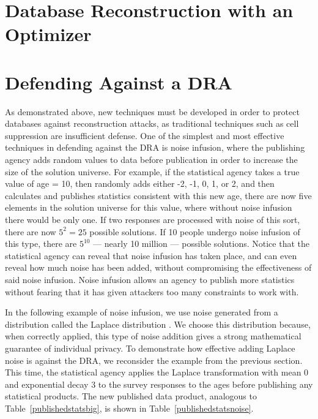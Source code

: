 \documentclass[5p,times,11pt]{elsarticle}
\begin{document}
\section{Database Reconstruction with an Optimizer}

\section{Defending Against a DRA}
As demonstrated above, new techniques must be developed in
order to protect databases against reconstruction attacks, as traditional techniques such as cell suppression are insufficient defense. One of the simplest and most effective techniques in defending against the DRA is noise infusion, where the publishing agency adds random values to data before publication in order to increase the size of the solution universe. For example, if the statistical agency takes a true value of age = 10, then randomly adds either -2, -1, 0, 1, or 2, and then calculates and publishes statistics consistent with this new age, there are now five elements in the solution universe for this value, where without noise infusion there would be only one. If two responses are processed with noise of this sort, there are now $5^2 = 25$ possible solutions. If 10 people undergo noise infusion of this type, there are $5^{10}$ --- nearly 10 million --- possible solutions. Notice that the statistical agency can reveal that noise infusion has taken place, and can even reveal how much noise has been added, without compromising the effectiveness of said noise infusion. Noise infusion allows an agency to publish more statistics without fearing that it has given attackers too many constraints to work with.


In the following example of noise infusion, we use noise generated
from a distribution called the Laplace distribution
\cite{Dwork:2006:CNS:2180286.2180305}. We choose this distribution
because, when correctly applied, this type of noise addition gives a
strong mathematical guarantee of individual privacy. To demonstrate
how effective adding Laplace noise is against the DRA, we reconsider
the example from the previous section. This time, the statistical
agency applies the Laplace transformation with mean 0 and exponential
decay 3 to the survey responses to the ages before publishing any
statistical products. The new published data product, analogous to
Table~\ref{publishedstatsbig}, is shown in
Table~\ref{publishedstatsnoise}.
\end{document}
